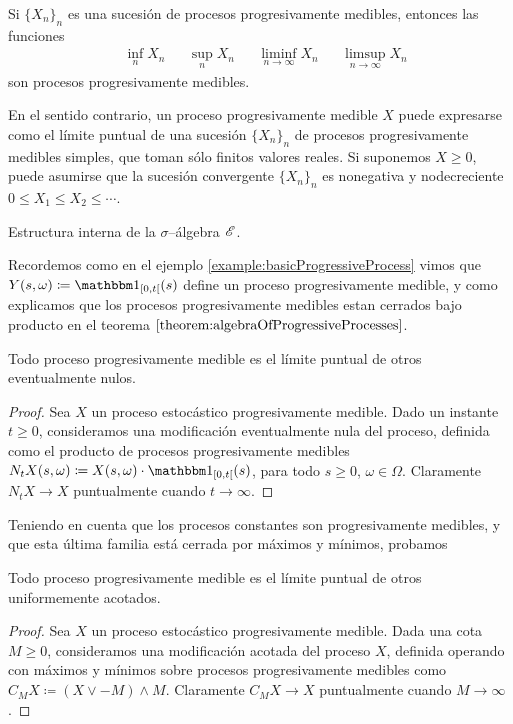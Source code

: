 \begin{theorem}
  Si \(\{X_n\}_n\) es una sucesión de procesos progresivamente medibles, entonces las funciones 
  \begin{align}
    & \inf_n X_n
    &&  \sup_n X_n
    &&  \liminf_{n \rightarrow \infty} X_n
    &&  \limsup_{n \rightarrow \infty} X_n
  \end{align}
  son procesos progresivamente medibles.

  En el sentido contrario, un proceso progresivamente medible \(X\) puede expresarse como el límite puntual de una sucesión \(\{X_n\}_n\) de procesos progresivamente medibles simples, que toman sólo finitos valores reales.
  Si suponemos \(X \geq 0\), puede asumirse que la sucesión convergente \(\{X_n\}_n\) es nonegativa y nodecreciente \(0 \leq X_1 \leq X_2 \leq \cdots\).
\end{theorem}

Estructura interna de la \(\sigma\)--álgebra \(\mathscr{E}\).

Recordemos como en el ejemplo \ref{example:basicProgressiveProcess} vimos que \(Y(s, \omega) \coloneqq \characteristic_{\interval{co}{0}{t}}(s)\) define un proceso progresivamente medible, y como explicamos que los procesos progresivamente medibles estan cerrados bajo producto en el teorema \(\ref{theorem:algebraOfProgressiveProcesses}\).

\begin{lemma}
  Todo proceso progresivamente medible es el límite puntual de otros eventualmente nulos.
\end{lemma}
\begin{proof}
  Sea \(X\) un proceso estocástico progresivamente medible.
  Dado un instante \(t \geq 0\), consideramos una modificación eventualmente nula del proceso, definida como el producto de procesos progresivamente medibles \(N_t X (s, \omega) \coloneqq X(s, \omega) \cdot \characteristic_{[0, t[} (s)\), para todo \(s \geq 0\), \(\omega \in \Omega\).
  Claramente \(N_t X \rightarrow X\) puntualmente cuando \(t \rightarrow \infty\).
\end{proof}

Teniendo en cuenta que los procesos constantes son progresivamente medibles, y que esta última familia está cerrada por máximos y mínimos, probamos
\begin{lemma}
  Todo proceso progresivamente medible es el límite puntual de otros uniformemente acotados.
\end{lemma}
\begin{proof}
  Sea \(X\) un proceso estocástico progresivamente medible.
  Dada una cota \(M \geq 0\), consideramos una modificación acotada del proceso \(X\), definida operando con máximos y mínimos sobre procesos progresivamente medibles como \(C_M X \coloneqq (X \vee - M) \wedge M\).
  Claramente \(C_M X \rightarrow X\) puntualmente cuando \(M \rightarrow \infty\).
\end{proof}


